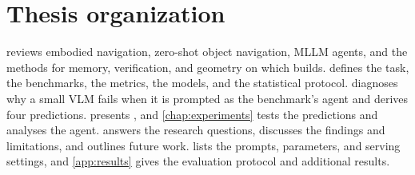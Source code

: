 \section{Thesis organization}
\label{sec:intro-outline}
 reviews embodied navigation, zero-shot object navigation, MLLM agents, and the methods for
memory, verification, and geometry on which \ours builds.  defines the task, the benchmarks, the
metrics, the models, and the statistical protocol.  diagnoses why a small VLM fails when it is
prompted as the benchmark's agent and derives four predictions.  presents \ours, and
\cref{chap:experiments} tests the predictions and analyses the agent.  answers the research
questions, discusses the findings and limitations, and outlines future work.  lists the prompts,
parameters, and serving settings, and \cref{app:results} gives the evaluation protocol and additional results.
